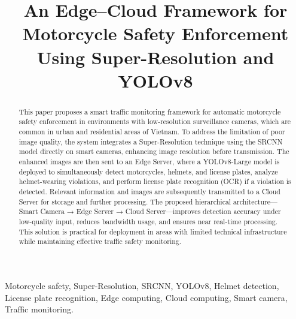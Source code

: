 \documentclass[conference]{IEEEtran}
\begin{document}

\title{An Edge–Cloud Framework for Motorcycle Safety Enforcement Using Super-Resolution and YOLOv8}


\author{
}
\maketitle



\begin{abstract}

This paper proposes a smart traffic monitoring framework for automatic motorcycle safety enforcement in environments with low-resolution surveillance cameras, which are common in urban and residential areas of Vietnam. To address the limitation of poor image quality, the system integrates a Super-Resolution technique using the SRCNN model directly on smart cameras, enhancing image resolution before transmission. The enhanced images are then sent to an Edge Server, where a YOLOv8-Large model is deployed to simultaneously detect motorcycles, helmets, and license plates, analyze helmet-wearing violations, and perform license plate recognition (OCR) if a violation is detected. Relevant information and images are subsequently transmitted to a Cloud Server for storage and further processing. The proposed hierarchical architecture—Smart Camera → Edge Server → Cloud Server—improves detection accuracy under low-quality input, reduces bandwidth usage, and ensures near real-time processing. This solution is practical for deployment in areas with limited technical infrastructure while maintaining effective traffic safety monitoring.

\end{abstract}

\begin{IEEEkeywords}
Motorcycle safety, Super-Resolution, SRCNN, YOLOv8, Helmet detection, License plate recognition, Edge computing, Cloud computing, Smart camera, Traffic monitoring.
\end{IEEEkeywords}
\end{document}
